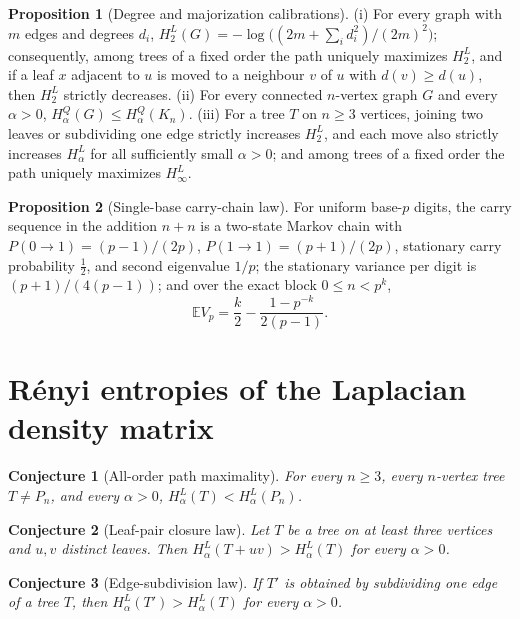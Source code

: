 \documentclass[11pt]{article}
\newtheorem{conjecture}{Conjecture}
\theoremstyle{definition}
\newtheorem{proposition}{Proposition}
\begin{document}
\begin{proposition}[Degree and majorization calibrations]\label{ab:deg}
(i) For every graph with $m$ edges and degrees $d_i$, $H^L_2(G)=-\log\bigl((2m+\sum_id_i^2)/(2m)^2\bigr)$; consequently, among trees of a fixed order the path uniquely maximizes $H^L_2$, and if a leaf $x$ adjacent to $u$ is moved to a neighbour $v$ of $u$ with $d(v)\ge d(u)$, then $H^L_2$ strictly decreases.  (ii) For every connected $n$-vertex graph $G$ and every $\alpha>0$, $H^Q_\alpha(G)\le H^Q_\alpha(K_n)$.  (iii) For a tree $T$ on $n\ge3$ vertices, joining two leaves or subdividing one edge strictly increases $H^L_2$, and each move also strictly increases $H^L_\alpha$ for all sufficiently small $\alpha>0$; and among trees of a fixed order the path uniquely maximizes $H^L_\infty$.
\end{proposition}

\begin{proposition}[Single-base carry-chain law]\label{ab:carry}
For uniform base-$p$ digits, the carry sequence in the addition $n+n$ is a two-state Markov chain with $P(0\to1)=(p-1)/(2p)$, $P(1\to1)=(p+1)/(2p)$, stationary carry probability $\tfrac12$, and second eigenvalue $1/p$; the stationary variance per digit is $(p+1)/(4(p-1))$; and over the exact block $0\le n<p^k$,
\[
\mathbb EV_p=\frac k2-\frac{1-p^{-k}}{2(p-1)}.
\]
\end{proposition}

\section{R\'enyi entropies of the Laplacian density matrix}

\begin{conjecture}[All-order path maximality]\label{ab1}
For every $n\ge3$, every $n$-vertex tree $T\ne P_n$, and every $\alpha>0$, $H^L_\alpha(T)<H^L_\alpha(P_n)$.
\end{conjecture}

\begin{conjecture}[Leaf-pair closure law]\label{ab2}
Let $T$ be a tree on at least three vertices and $u,v$ distinct leaves.  Then $H^L_\alpha(T+uv)>H^L_\alpha(T)$ for every $\alpha>0$.
\end{conjecture}

\begin{conjecture}[Edge-subdivision law]\label{ab3}
If $T'$ is obtained by subdividing one edge of a tree $T$, then $H^L_\alpha(T')>H^L_\alpha(T)$ for every $\alpha>0$.
\end{conjecture}
\end{document}
